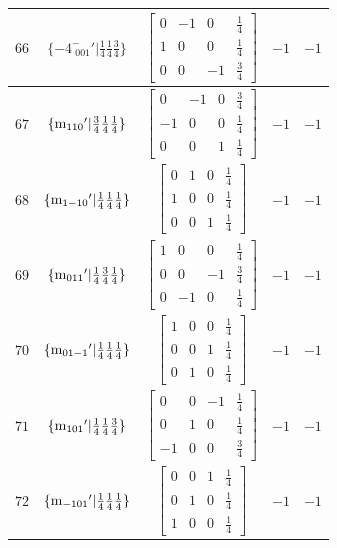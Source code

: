\documentclass[fleqn,8pt]{jsarticle}
\begin{document}
\begin{longtable}{ccccc}
$ 66 $ & $ \{-4^{-}_{\,\,001}{}'|\frac{1}{4} \frac{1}{4} \frac{3}{4}\} $ & $ \begin{bmatrix} 0 & -1 & 0 & \frac{1}{4} \\ 1 & 0 & 0 & \frac{1}{4} \\ 0 & 0 & -1 & \frac{3}{4} \end{bmatrix} $ & $ -1 $ & $ -1 $ \\ \hline
$ 67 $ & $ \{{\rm m}_{110}{}'|\frac{3}{4} \frac{1}{4} \frac{1}{4}\} $ & $ \begin{bmatrix} 0 & -1 & 0 & \frac{3}{4} \\ -1 & 0 & 0 & \frac{1}{4} \\ 0 & 0 & 1 & \frac{1}{4} \end{bmatrix} $ & $ -1 $ & $ -1 $ \\ \hline
$ 68 $ & $ \{{\rm m}_{1-10}{}'|\frac{1}{4} \frac{1}{4} \frac{1}{4}\} $ & $ \begin{bmatrix} 0 & 1 & 0 & \frac{1}{4} \\ 1 & 0 & 0 & \frac{1}{4} \\ 0 & 0 & 1 & \frac{1}{4} \end{bmatrix} $ & $ -1 $ & $ -1 $ \\ \hline
$ 69 $ & $ \{{\rm m}_{011}{}'|\frac{1}{4} \frac{3}{4} \frac{1}{4}\} $ & $ \begin{bmatrix} 1 & 0 & 0 & \frac{1}{4} \\ 0 & 0 & -1 & \frac{3}{4} \\ 0 & -1 & 0 & \frac{1}{4} \end{bmatrix} $ & $ -1 $ & $ -1 $ \\ \hline
$ 70 $ & $ \{{\rm m}_{01-1}{}'|\frac{1}{4} \frac{1}{4} \frac{1}{4}\} $ & $ \begin{bmatrix} 1 & 0 & 0 & \frac{1}{4} \\ 0 & 0 & 1 & \frac{1}{4} \\ 0 & 1 & 0 & \frac{1}{4} \end{bmatrix} $ & $ -1 $ & $ -1 $ \\ \hline
$ 71 $ & $ \{{\rm m}_{101}{}'|\frac{1}{4} \frac{1}{4} \frac{3}{4}\} $ & $ \begin{bmatrix} 0 & 0 & -1 & \frac{1}{4} \\ 0 & 1 & 0 & \frac{1}{4} \\ -1 & 0 & 0 & \frac{3}{4} \end{bmatrix} $ & $ -1 $ & $ -1 $ \\ \hline
$ 72 $ & $ \{{\rm m}_{-101}{}'|\frac{1}{4} \frac{1}{4} \frac{1}{4}\} $ & $ \begin{bmatrix} 0 & 0 & 1 & \frac{1}{4} \\ 0 & 1 & 0 & \frac{1}{4} \\ 1 & 0 & 0 & \frac{1}{4} \end{bmatrix} $ & $ -1 $ & $ -1 $ \\ \hline

\end{longtable}
\end{document}
